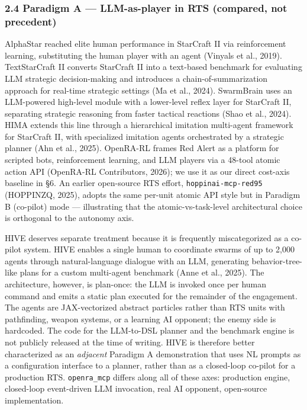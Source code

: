 \documentclass[
  journal]{IEEEtran}
\begin{document}
\subsubsection{2.4 Paradigm A --- LLM-as-player in RTS (compared, not
precedent)}\label{paradigm-a-llm-as-player-in-rts-compared-not-precedent}

AlphaStar reached elite human performance in StarCraft II via
reinforcement learning, substituting the human player with an agent
(Vinyals et al., 2019). TextStarCraft II converts StarCraft II into a
text-based benchmark for evaluating LLM strategic decision-making and
introduces a chain-of-summarization approach for real-time strategic
settings (Ma et al., 2024). SwarmBrain uses an LLM-powered high-level
module with a lower-level reflex layer for StarCraft II, separating
strategic reasoning from faster tactical reactions (Shao et al., 2024).
HIMA extends this line through a hierarchical imitation multi-agent
framework for StarCraft II, with specialized imitation agents
orchestrated by a strategic planner (Ahn et al., 2025). OpenRA-RL frames
Red Alert as a platform for scripted bots, reinforcement learning, and
LLM players via a 48-tool atomic action API (OpenRA-RL Contributors,
2026); we use it as our direct cost-axis baseline in §6. An earlier
open-source RTS effort, \texttt{hoppinai-mcp-red95} (HOPPINZQ, 2025),
adopts the same per-unit atomic API style but in Paradigm B (co-pilot)
mode --- illustrating that the atomic-vs-task-level architectural choice
is orthogonal to the autonomy axis.

HIVE deserves separate treatment because it is frequently miscategorized
as a co-pilot system. HIVE enables a single human to coordinate swarms
of up to 2,000 agents through natural-language dialogue with an LLM,
generating behavior-tree-like plans for a custom multi-agent benchmark
(Anne et al., 2025). The architecture, however, is plan-once: the LLM is
invoked once per human command and emits a static plan executed for the
remainder of the engagement. The agents are JAX-vectorized abstract
particles rather than RTS units with pathfinding, weapon systems, or a
learning AI opponent; the enemy side is hardcoded. The code for the
LLM-to-DSL planner and the benchmark engine is not publicly released at
the time of writing. HIVE is therefore better characterized as an
\emph{adjacent} Paradigm A demonstration that uses NL prompts as a
configuration interface to a planner, rather than as a closed-loop
co-pilot for a production RTS. \texttt{openra\_mcp} differs along all of
these axes: production engine, closed-loop event-driven LLM invocation,
real AI opponent, open-source implementation.
\end{document}
